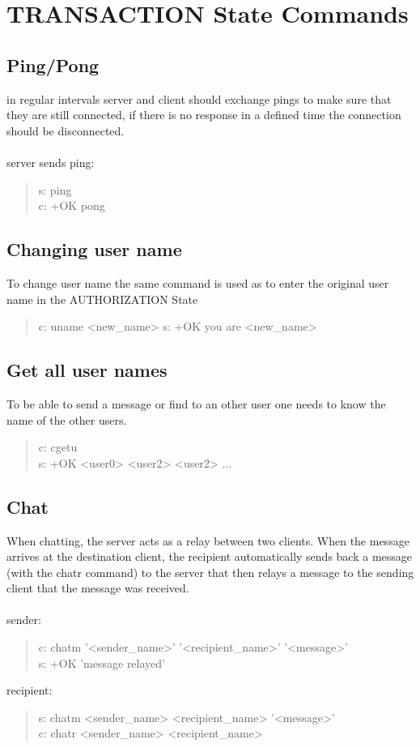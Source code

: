 \documentclass[a4paper,11pt]{article}
\begin{document}
\clearpage
\section{TRANSACTION State Commands}
\subsection{Ping/Pong}
in regular intervals server and client should exchange pings to make sure that they are still connected, if there is no response in a defined time the connection should be disconnected.\\\\
\noindent
server sends ping:
\begin{quote}
  s: ping\\
  c: +OK pong
\end{quote}

\subsection{Changing user name}
To change user name the same command is used as to enter the original user name in the AUTHORIZATION State\\
\begin{quote}
  c: uname <new\_name>
  s: +OK you are <new\_name>
\end{quote}


\subsection{Get all user names}
To be able to send a message or find to an other user one needs to know the name of the other users.
\begin{quote}
  c: cgetu\\
  s: +OK <user0> <user2> <user2> ...
\end{quote} 
\subsection{Chat}
When chatting, the server acts as a relay between two clients. When the message arrives at the destination client, the recipient automatically sends back a message (with the chatr command) to the server that then relays a message to the sending client that the message was received.\\\\
sender:
\begin{quote}
  c: chatm '<sender\_name>' '<recipient\_name>' '<message>'\\ %
  s: +OK 'message relayed'
\end{quote}
\noindent
recipient:
\begin{quote}
    s: chatm <sender\_name> <recipient\_name> '<message>'\\
  c: chatr <sender\_name> <recipient\_name>%
\end{quote}
\end{document}

